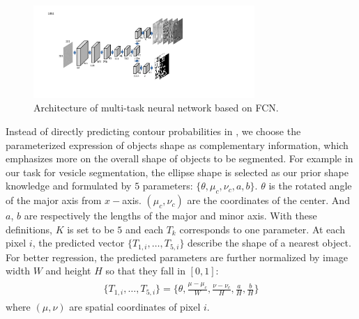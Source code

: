 \begin{figure}
    \begin{center}
        \includegraphics[width=3.3in]{figures/FigMTN.pdf}
    \end{center}
    \caption{Architecture of multi-task neural network based on FCN. }
    \label{FigMTN}
\end{figure}
Instead of directly predicting contour probabilities in \cite{Chen2016a,Xu2016}, we choose the parameterized expression of objects shape as complementary information, which emphasizes more on the overall shape of objects to be segmented.
For example in our task for vesicle segmentation, the ellipse shape is selected as our prior shape knowledge and formulated by $5$ parameters: $\{\theta, \mu_c, \nu_c, a, b\}$.
$\theta$ is the rotated angle of the major axis from $x-$axis.
$(\mu_c, \nu_c)$ are the coordinates of the center.
And $a$, $b$ are respectively the lengths of the major and minor axis.
With these definitions, $K$ is set to be $5$ and each $T_k$ corresponds to one parameter.
At each pixel $i$, the predicted vector $\{T_{1,i},\ldots,T_{5,i}\}$ describe the shape of a nearest object.
For better regression, the predicted parameters are further normalized by image width $W$ and height $H$ so that they fall in $[0,1]$:
\begin{eqnarray}\label{EqMax}
\begin{aligned}
\{T_{1,i},\ldots,T_{5,i}\} = \{\theta,\frac{\mu-\mu_c}{W},\frac{\nu-\nu_c}{H},\frac{a}{H},\frac{b}{H}\}
\end{aligned}
\end{eqnarray}
where $(\mu, \nu)$ are spatial coordinates of pixel $i$.

